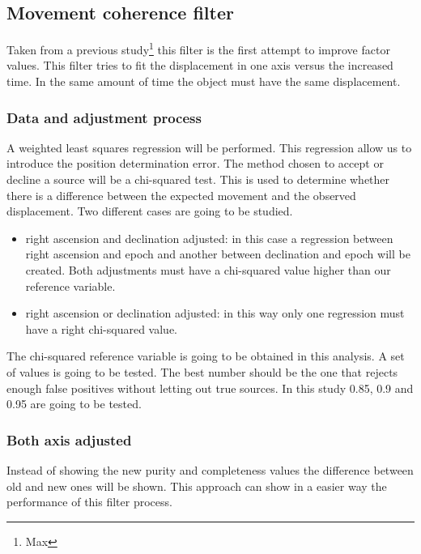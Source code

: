 \documentclass{article}
\begin{document}
\subsection{Movement coherence filter}
Taken from a previous study\footnote{Max} this filter is the first attempt to improve factor values. This filter tries to fit the displacement in one axis versus the increased time. In the same amount of time the object must have the same displacement.

\subsubsection{Data and adjustment process}
A weighted least squares regression will be performed. This regression allow us to introduce the position determination error. The method chosen to accept or decline a source will be a chi-squared test. This is used to determine whether there is a difference between the expected movement and the observed displacement. Two different cases are going to be studied.
\begin{itemize}
\item right ascension and declination adjusted: in this case a regression between right ascension and epoch and another between declination and epoch will be created. Both adjustments must have a chi-squared value higher than our reference variable.
\item right ascension or declination adjusted: in this way only one regression must have a right chi-squared value. 
\end{itemize}
\par The chi-squared reference variable is going to be obtained in this analysis. A set of values is going to be tested. The best number should be the one that rejects enough false positives without letting out true sources. In this study 0.85, 0.9 and 0.95 are going to be tested.

\subsubsection{Both axis adjusted}
Instead of showing the new purity and completeness values the difference between old and new ones will be shown. This approach can show in a easier way the performance of this filter process.
\end{document}
